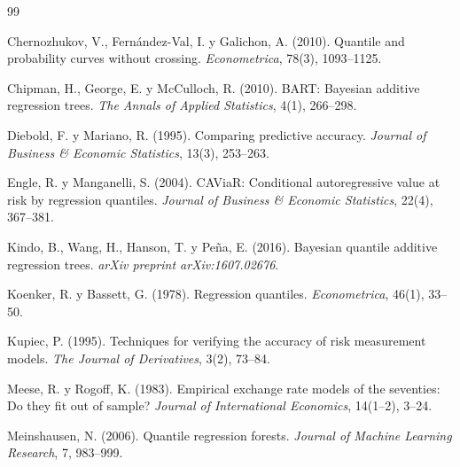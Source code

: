 \documentclass[11pt,a4paper]{article}
\begin{document}
\begin{thebibliography}{99}

Chernozhukov, V., Fernández-Val, I. y Galichon, A. (2010).
Quantile and probability curves without crossing.
\textit{Econometrica}, 78(3), 1093--1125.

Chipman, H., George, E. y McCulloch, R. (2010).
BART: Bayesian additive regression trees.
\textit{The Annals of Applied Statistics}, 4(1), 266--298.

Diebold, F. y Mariano, R. (1995).
Comparing predictive accuracy.
\textit{Journal of Business \& Economic Statistics}, 13(3), 253--263.

Engle, R. y Manganelli, S. (2004).
CAViaR: Conditional autoregressive value at risk by regression quantiles.
\textit{Journal of Business \& Economic Statistics}, 22(4), 367--381.

Kindo, B., Wang, H., Hanson, T. y Peña, E. (2016).
Bayesian quantile additive regression trees.
\textit{arXiv preprint arXiv:1607.02676}.

Koenker, R. y Bassett, G. (1978).
Regression quantiles.
\textit{Econometrica}, 46(1), 33--50.

Kupiec, P. (1995).
Techniques for verifying the accuracy of risk measurement models.
\textit{The Journal of Derivatives}, 3(2), 73--84.

Meese, R. y Rogoff, K. (1983).
Empirical exchange rate models of the seventies: Do they fit out of sample?
\textit{Journal of International Economics}, 14(1--2), 3--24.

Meinshausen, N. (2006).
Quantile regression forests.
\textit{Journal of Machine Learning Research}, 7, 983--999.

\end{thebibliography}
\end{document}
